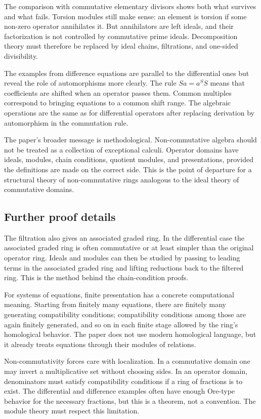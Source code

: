 \documentclass[12pt]{article}
\begin{document}
The comparison with commutative elementary divisors shows both what survives and what fails. Torsion
modules still make sense: an element is torsion if some non-zero operator annihilates it. But
annihilators are left ideals, and their factorization is not controlled by commutative prime ideals.
Decomposition theory must therefore be replaced by ideal chains, filtrations, and one-sided
divisibility.

The examples from difference equations are parallel to the differential ones but reveal the role of
automorphisms more clearly. The rule \(Sa=a^S S\) means that coefficients are shifted when an
operator passes them. Common multiples correspond to bringing equations to a common shift range. The
algebraic operations are the same as for differential operators after replacing derivation by
automorphism in the commutation rule.

The paper's broader message is methodological. Non-commutative algebra should not be treated as a
collection of exceptional calculi. Operator domains have ideals, modules, chain conditions, quotient
modules, and presentations, provided the definitions are made on the correct side. This is the point
of departure for a structural theory of non-commutative rings analogous to the ideal theory of
commutative domains.


\subsection{Further proof details}

The filtration also gives an associated graded ring. In the differential case the associated graded
ring is often commutative or at least simpler than the original operator ring. Ideals and modules
can then be studied by passing to leading terms in the associated graded ring and lifting reductions
back to the filtered ring. This is the method behind the chain-condition proofs.

For systems of equations, finite presentation has a concrete computational meaning. Starting from
finitely many equations, there are finitely many generating compatibility conditions; compatibility
conditions among those are again finitely generated, and so on in each finite stage allowed by the
ring's homological behavior. The paper does not use modern homological language, but it already
treats equations through their modules of relations.

Non-commutativity forces care with localization. In a commutative domain one may invert a
multiplicative set without choosing sides. In an operator domain, denominators must satisfy
compatibility conditions if a ring of fractions is to exist. The differential and difference
examples often have enough Ore-type behavior for the necessary fractions, but this is a theorem, not
a convention. The module theory must respect this limitation.
\end{document}
